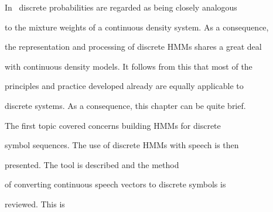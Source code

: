 




In \HTK\ discrete probabilities are regarded as being closely analogous


to the mixture weights of a continuous density system.  As a consequence,


the representation and processing of discrete HMMs shares a great deal


with continuous density models.  It follows from this that most of the


principles and practice developed already are equally applicable to


discrete systems.  As a consequence, this chapter can be quite brief.





The first topic covered concerns building HMMs for discrete


symbol sequences.  The use of discrete HMMs with speech is then


presented.  The tool  is described and the method


of converting continuous speech vectors to discrete symbols is


reviewed.  This is 


